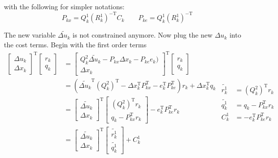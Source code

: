 \documentclass{article}%
\newcommand{\tp}{^{\mathrm{T}}}
\newcommand{\itp}{^{\mathrm{-T}}}
\begin{document}
with the following for simpler notations: 
\begin{equation}
	P_{kx} = Q_{k}^{1}(R_{k}^1)\itp C_k  \qquad
	P_{ke} = Q_{k}^{1}(R_{k}^1)\itp
\end{equation}

The new variable $\tilde{\Delta u_k}$ is not constrained anymore. 
Now plug the new $\Delta u_k$ into the cost terms. Begin with the first order terms
\begin{subequations}
	\begin{align}
	\begin{bmatrix}
	\Delta u_k \\
	\Delta x_k 
	\end{bmatrix}\tp 
	\begin{bmatrix}
	r_k \\
	q_k 
	\end{bmatrix} 
	&= 
	\begin{bmatrix}
	Q_k^2 \tilde{\Delta u_k} - P_{kx}\Delta x_k - P_{ke}e_k) \\
	\Delta x_k
	\end{bmatrix}\tp
	\begin{bmatrix}
	r_k \\
	q_k 
	\end{bmatrix} \\ 
	&= 
	\left( 
	\tilde{\Delta u_k}\tp (Q_k^2)\tp - 
	\Delta x_k\tp P_{kx}\tp -
	e_k\tp P_{ke}\tp 
	\right)r_k + \Delta x_k\tp q_k \\
	&= 
	\begin{bmatrix}
	\tilde{\Delta u_k} \\
	\Delta x_k 
	\end{bmatrix}\tp 
	\begin{bmatrix}
	(Q_k^2)\tp r_k \\
	q_k - P_{kx}\tp r_k 
	\end{bmatrix} -  e_k\tp P_{ke}\tp r_k \\
	&= 
	\begin{bmatrix}
	\tilde{\Delta u_k} \\
	\Delta x_k 
	\end{bmatrix}\tp 
	\begin{bmatrix}
	\tilde{r_k^1} \\
	\tilde{q_k^1}
	\end{bmatrix} + C_k^1
	\end{align}
	\begin{align}
	\tilde{r_k^1} &= (Q_k^2)\tp r_k \\
	\tilde{q_k^1} &= q_k - P_{kx}\tp r_k \\
	C_k^1 &= -  e_k\tp P_{ke}\tp r_k
	\end{align}
\end{subequations}
\end{document}
